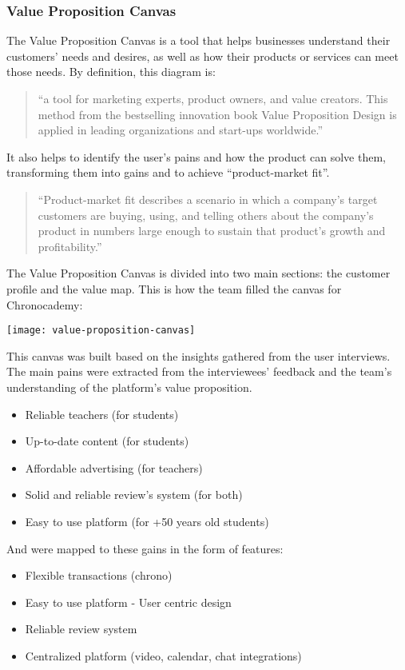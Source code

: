 \subsubsection{Value Proposition Canvas}\label{subsubsec:value-proposition-canvas}
The Value Proposition Canvas is a tool that helps businesses understand their customers' needs and desires, as well as how their products or services can meet those needs.
By definition, this diagram is:
\begin{quote}
    ``a tool for marketing experts, product
    owners, and value creators.
    This method from the bestselling innovation
    book Value Proposition Design is applied in leading organizations and
    start-ups worldwide.''~\cite{valuePropositionCanvas}
\end{quote}

It also helps to identify the user's pains and how the product can solve them, transforming them into gains and to achieve ``product-market fit''.\newline
\begin{quote}
    ``Product-market fit describes a scenario in which a company’s target
    customers are buying, using, and telling others about the company’s
    product in numbers large enough to sustain that product’s growth and
    profitability.''~\cite{productMarketFit}
\end{quote}

The Value Proposition Canvas is divided into two main sections: the customer profile and the value map.
This is how the team filled the canvas for Chronocademy:

\begin{center}
    \texttt{[image: value-proposition-canvas]}
\end{center}

This canvas was built based on the insights gathered from the user interviews.
The main pains were extracted from the interviewees' feedback and the team's understanding of the platform's value proposition.
\begin{itemize}
    \item Reliable teachers (for students)
    \item Up-to-date content (for students)
    \item Affordable advertising (for teachers)
    \item Solid and reliable review's system (for both)
    \item Easy to use platform (for +50 years old students)
\end{itemize}
And were mapped to these gains in the form of features:
\begin{itemize}
    \item Flexible transactions (chrono)
    \item Easy to use platform - User centric design
    \item Reliable review system
    \item Centralized platform (video, calendar, chat integrations)
\end{itemize}

